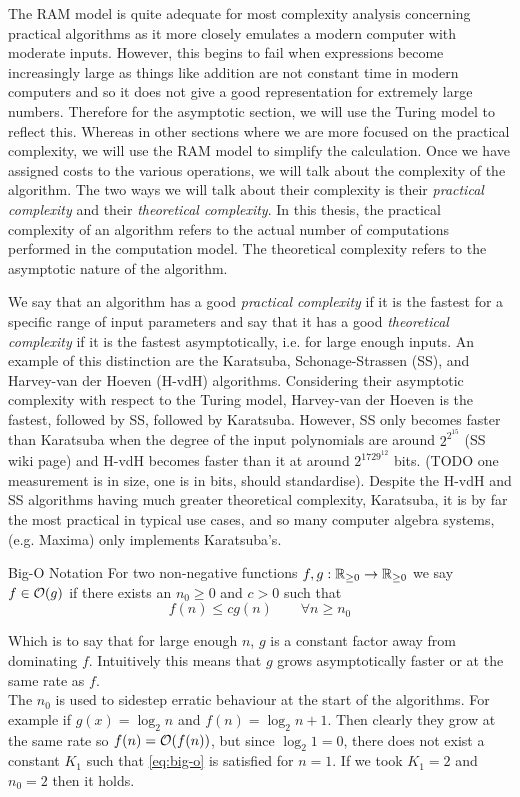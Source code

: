 The RAM model is quite adequate for most complexity analysis concerning practical algorithms as it more closely emulates a modern computer with moderate inputs. However, this begins to fail when expressions become increasingly large as things like addition are not constant time in modern computers and so it does not give a good representation for extremely large numbers. Therefore for the asymptotic section, we will use the Turing model to reflect this. Whereas in other sections where we are more focused on the practical complexity, we will use the RAM model to simplify the calculation.
Once we have assigned costs to the various operations, we will talk about the complexity of the algorithm. The two ways we will talk about their complexity is their \emph{practical complexity} and their \emph{theoretical complexity}. In this thesis, the practical complexity of an algorithm refers to the actual number of computations performed in the computation model. The theoretical complexity refers to the asymptotic nature of the algorithm. 

We say that an algorithm has a good \textit{practical complexity} if it is the fastest for a specific range of input parameters and say that it has a good \textit{theoretical complexity} if it is the fastest asymptotically, i.e. for large enough inputs. An example of this distinction are the Karatsuba, Schonage-Strassen (SS), and Harvey-van der Hoeven (H-vdH) algorithms. Considering their asymptotic complexity with respect to the Turing model, Harvey-van der Hoeven is the fastest, followed by SS, followed by Karatsuba. However, SS only becomes faster than Karatsuba when the degree of the input polynomials are around $2^{2^{15}}$ (SS wiki page) and H-vdH becomes faster than it at around $2^{1729^{12}}$ bits. (TODO one measurement is in size, one is in bits, should standardise). Despite the H-vdH and SS algorithms having much greater theoretical complexity, Karatsuba, it is by far the most practical in typical use cases, and so many computer algebra systems, (e.g. Maxima) only implements Karatsuba's.

\begin{definition}{Big-O Notation}
    For two non-negative functions $f, g: {\mathbb R}_{\ge 0} \to {\mathbb R}_{\ge 0}$ we say $f \in \mathcal O(g)$ if there exists an $n_0 \ge 0$ and $c > 0$ such that 
    \begin{equation}\label{eq:big-o}
        f(n) \le cg(n) \qquad \forall n \ge n_0
    \end{equation}
\end{definition}
Which is to say that for large enough $n$, $g$ is a constant factor away from dominating $f$. Intuitively this means that $g$ grows asymptotically faster or at the same rate as $f$.\\
The $n_0$ is used to sidestep erratic behaviour at the start of the algorithms. For example if $g(x) = \log_2 n$ and $f(n) = \log_2 n + 1$. Then clearly they grow at the same rate so $f(n) = \mathcal O(f(n))$, but since $\log_2 1 = 0$, there does not exist a constant $K_1$ such that \eqref{eq:big-o} is satisfied for $n = 1$. If we took $K_1 = 2$ and $n_0 = 2$ then it holds.

